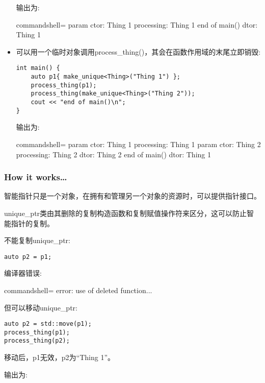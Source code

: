 \begin{itemize}
输出为:

\begin{tcblisting}{commandshell={}}
param ctor: Thing 1
processing: Thing 1
end of main()
dtor: Thing 1
\end{tcblisting}

\item 
可以用一个临时对象调用process\_thing()，其会在函数作用域的末尾立即销毁:

\begin{lstlisting}[style=styleCXX]
int main() {
	auto p1{ make_unique<Thing>("Thing 1") };
	process_thing(p1);
	process_thing(make_unique<Thing>("Thing 2"));
	cout << "end of main()\n";
}
\end{lstlisting}

输出为:

\begin{tcblisting}{commandshell={}}
param ctor: Thing 1
processing: Thing 1
param ctor: Thing 2
processing: Thing 2
dtor: Thing 2
end of main()
dtor: Thing 1
\end{tcblisting}

\end{itemize}

\subsubsection{How it works…}

智能指针只是一个对象，在拥有和管理另一个对象的资源时，可以提供指针接口。

unique\_ptr类由其删除的复制构造函数和复制赋值操作符来区分，这可以防止智能指针的复制。

不能复制unique\_ptr:

\begin{lstlisting}[style=styleCXX]
auto p2 = p1;
\end{lstlisting}

编译器错误:

\begin{tcblisting}{commandshell={}}
error: use of deleted function...
\end{tcblisting}

但可以移动unique\_ptr:

\begin{lstlisting}[style=styleCXX]
auto p2 = std::move(p1);
process_thing(p1);
process_thing(p2);
\end{lstlisting}

移动后，p1无效，p2为“Thing 1”。

输出为:

